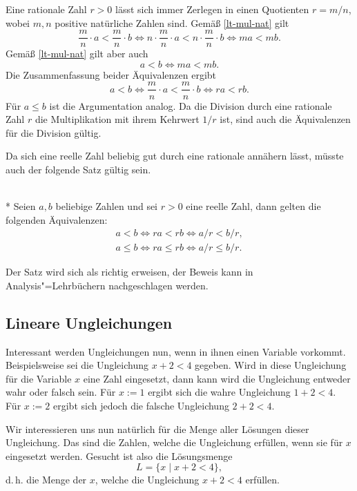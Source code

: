 \noindent{}
Eine rationale Zahl $r>0$ lässt sich immer Zerlegen in einen Quotienten
$r=m/n$, wobei $m,n$ positive natürliche Zahlen sind. Gemäß
\eqref{lt-mul-nat} gilt
\begin{equation}
\frac{m}{n}\cdot a<\frac{m}{n}\cdot b
\iff n\cdot\frac{m}{n}\cdot a<n\cdot\frac{m}{n}\cdot b
\iff ma<mb.
\end{equation}
Gemäß \eqref{lt-mul-nat} gilt aber auch
\begin{equation}
a<b\iff ma<mb.
\end{equation}
Die Zusammenfassung beider Äquivalenzen ergibt
\begin{equation}
a<b\iff \frac{m}{n}\cdot a<\frac{m}{n}\cdot b\iff ra<rb.
\end{equation}
Für $a\le b$ ist die Argumentation analog. Da die Division durch
eine rationale Zahl $r$ die Multiplikation mit ihrem Kehrwert $1/r$ ist,
sind auch die Äquivalenzen für die Division gültig.\;\qedsymbol

Da sich eine reelle Zahl beliebig gut durch eine rationale annähern
lässt, müsste auch der folgende Satz gültig sein.

\begin{Satz}\mbox{}\\*
Seien $a,b$ beliebige Zahlen und sei $r>0$ eine reelle Zahl,
dann gelten die folgenden Äquivalenzen:
\begin{gather}
\label{lt-mul-real} a<b\iff ra<rb\iff a/r<b/r,\\
\label{lt-mul-real} a\le b\iff ra\le rb\iff a/r\le b/r.
\end{gather}
\end{Satz}

\noindent
Der Satz wird sich als richtig erweisen, der Beweis kann in
Analysis"=Lehrbüchern nachgeschlagen werden.

\subsection{Lineare Ungleichungen}

Interessant werden Ungleichungen nun, wenn in ihnen einen Variable
vorkommt. Beispielsweise sei die Ungleichung $x+2<4$ gegeben.
Wird in diese Ungleichung für die Variable $x$ eine Zahl eingesetzt,
dann kann wird die Ungleichung entweder wahr oder falsch sein.
Für $x:=1$ ergibt sich die wahre Ungleichung $1+2<4$. Für $x:=2$
ergibt sich jedoch die falsche Ungleichung $2+2<4$.

Wir interessieren uns nun natürlich für die Menge aller Lösungen
dieser Ungleichung. Das sind die Zahlen, welche die Ungleichung
erfüllen, wenn sie für $x$ eingesetzt werden. Gesucht ist also
die Lösungsmenge
\[L = \{x\mid x+2<4\},\]
d.\,h. die Menge der $x$, welche die Ungleichung $x+2<4$ erfüllen.

